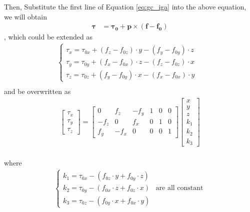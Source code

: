 Then, Substitute the first line of Equation \ref{eq:gc_iga} into the above equation, we will obtain
\begin{equation}
\begin{split}
\boldsymbol{\tau}	&=  \boldsymbol{\tau_0}+ 
						\boldsymbol{p}	\times \left( \boldsymbol{f} - \boldsymbol{f_0} \right) 
\end{split}
\end{equation}
, which could be extended as
\begin{equation}
\begin{split}
\left\{\begin{matrix}
\tau _{x}	=	\tau _{0x} 	+ \left( f_z - f_{0z}\right) \cdot y - \left( f_y - f_{0y}\right) \cdot z\\
\tau _{y}	=	\tau _{0y}	+ \left( f_x - f_{0x}\right) \cdot z - \left( f_z - f_{0z}\right) \cdot x\\
\tau _{z}	=	\tau _{0z}	+ \left( f_y - f_{0y}\right) \cdot x - \left( f_x - f_{0x}\right) \cdot y& 
\end{matrix}\right.	\\
\end{split}
\end{equation}
and be overwritten as
\begin{equation}\label{eq:matrix_mfrk}
\begin{split}
\begin{bmatrix}
\tau _x\\
\tau _y\\
\tau _z
\end{bmatrix}
=
\begin{bmatrix}
0		&f_z	&-f_y	&1	&0	&0\\
-f_z	&0		&f_x	&0	&1	&0\\
f_y		&-f_x	&0		&0	&0	&1
\end{bmatrix}
\begin{bmatrix}
x\\
y\\
z\\
k_1\\
k_2\\
k_3
\end{bmatrix}\\
\end{split}
\end{equation}
\par
where
\begin{equation}\label{eq:k1k2k3}
\begin{split}
\left\{\begin{matrix}
k_1 = \tau _{0x} - \left( f_{0z} \cdot y + f_{0y} \cdot z \right)  &  \\
k_2 = \tau _{0y} - \left( f_{0x} \cdot z + f_{0z} \cdot x \right)  &\text{are all constant} \\
k_3 = \tau _{0z} - \left( f_{0y} \cdot x + f_{0x} \cdot y \right)  & 
\end{matrix}\right.\\
\end{split}
\end{equation}
